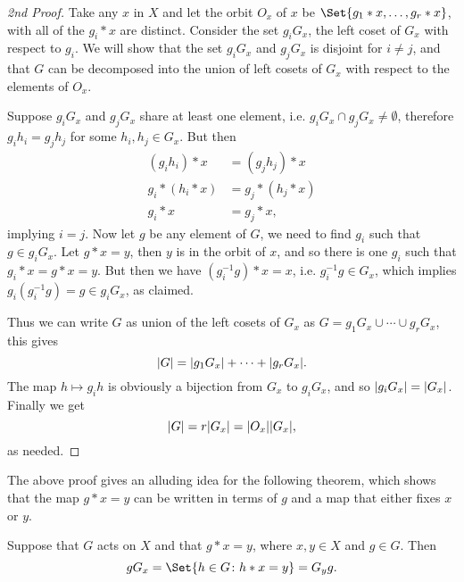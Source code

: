 \documentclass[main.tex]{subfiles}
\begin{document}
			\begin{proof}[2nd Proof]
				Take any $x$ in $X$ and let the orbit $O_x$ of $x$ be $\Set{g_1 \ast x, \ldots, g_r \ast x}$, with all of the $g_i \ast x$ are distinct. Consider the set $g_iG_x$, the left coset of $G_x$ with respect to $g_i$. We will show that the set $g_iG_x$ and $g_j G_x$ is disjoint for $i \neq j$, and that $G$ can be decomposed into the union of left cosets of $G_x$ with respect to the elements of $O_x$.
				
				Suppose $g_iG_x$ and $g_jG_x$ share at least one element, i.e. $g_i G_x \cap g_j G_x \neq \emptyset$, therefore $g_i h_i = g_j h_j$ for some $h_i, h_j \in G_x$. But then
				\begin{equation*}
				\begin{aligned}
					(g_i h_i)\ast x & = (g_j h_j)\ast x \\
					g_i \ast (h_i \ast x) & = g_j \ast (h_j \ast x) \\
					g_i \ast x & = g_j \ast x,
				\end{aligned}
				\end{equation*}
				implying $i = j$. Now let $g$ be any element of $G$, we need to find $g_i$ such that $g \in g_i G_x$. Let $g\ast x = y$, then $y$ is in the orbit of $x$, and so there is one $g_i$ such that $g_i \ast x = g \ast x = y$. But then we have $(g^{-1}_i g) \ast x = x$, i.e. $g^{-1}_i g \in G_x$, which implies $ g_i (g^{-1}_i g) = g \in g_i G_x$, as claimed. 
				
				Thus we can write $G$ as union of the left cosets of $G_x$ as $G = g_1 G_x \cup \cdots \cup g_r G_x$, this gives
				\begin{equation*}
					\lvert G\rvert = \lvert g_1 G_x\rvert + \cdots + \lvert g_r G_x\rvert.
				\end{equation*}
				The map $h \mapsto g_i h$ is obviously a bijection from $G_x$ to $g_i G_x$, and so $\lvert g_i G_x\rvert = \lvert G_x\rvert$. Finally we get
				\begin{equation*}
					\lvert G\rvert = r\lvert G_x\rvert = \lvert O_x\rvert\lvert G_x\rvert,
				\end{equation*}
				as needed.
			\end{proof}
			The above proof gives an alluding idea for the following theorem, which shows that the map $g \ast x = y$ can be written in terms of $g$ and a map that either fixes $x$ or $y$.
			\begin{theorem}
				Suppose that $G$ acts on $X$ and that $g \ast x = y$, where $x, y \in X$ and $g \in G$. Then
				\begin{equation*}
					g G_x = \Set{h \in G \colon h\ast x = y} = G_y g.
				\end{equation*}
			\end{theorem}
		
\end{document}
